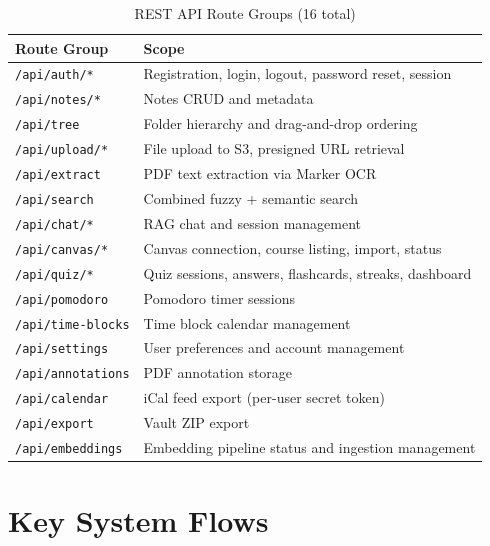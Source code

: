 \documentclass[12pt,a4paper]{article}
\begin{document}
\begin{table}[H]
\centering
\small
\begin{tabularx}{\textwidth}{lX}
\toprule
\textbf{Route Group} & \textbf{Scope} \\
\midrule
\texttt{/api/auth/*}       & Registration, login, logout, password reset, session \\
\texttt{/api/notes/*}      & Notes CRUD and metadata \\
\texttt{/api/tree}         & Folder hierarchy and drag-and-drop ordering \\
\texttt{/api/upload/*}     & File upload to S3, presigned URL retrieval \\
\texttt{/api/extract}      & PDF text extraction via Marker OCR \\
\texttt{/api/search}       & Combined fuzzy + semantic search \\
\texttt{/api/chat/*}       & RAG chat and session management \\
\texttt{/api/canvas/*}     & Canvas connection, course listing, import, status \\
\texttt{/api/quiz/*}       & Quiz sessions, answers, flashcards, streaks, dashboard \\
\texttt{/api/pomodoro}     & Pomodoro timer sessions \\
\texttt{/api/time-blocks}  & Time block calendar management \\
\texttt{/api/settings}     & User preferences and account management \\
\texttt{/api/annotations}  & PDF annotation storage \\
\texttt{/api/calendar}     & iCal feed export (per-user secret token) \\
\texttt{/api/export}       & Vault ZIP export \\
\texttt{/api/embeddings}   & Embedding pipeline status and ingestion management \\
\bottomrule
\end{tabularx}
\caption{REST API Route Groups (16 total)}
\label{tab:api-routes}
\end{table}


\section{Key System Flows}
\label{sec:flows}
\end{document}
